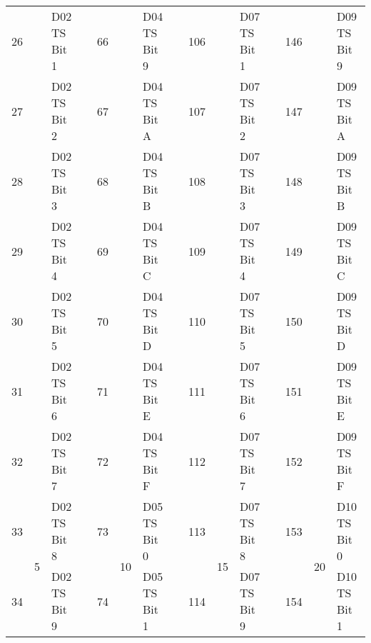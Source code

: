 \documentclass[]{article}
\begin{document}
\begin{landscape}
\begin{table}[]
\begin{tabular}{lllllllllllllll}
			26           &                    & D02 TS Bit 1                  &                   & 66           &                     & D04 TS Bit 9      &  & 106          &                     & D07 TS Bit 1      &  & 146          &                     & D09 TS Bit 9      \\
			27           &                    & D02 TS Bit 2                  &                   & 67           &                     & D04 TS Bit A      &  & 107          &                     & D07 TS Bit 2      &  & 147          &                     & D09 TS Bit A      \\
			28           &                    & D02 TS Bit 3                  &                   & 68           &                     & D04 TS Bit B      &  & 108          &                     & D07 TS Bit 3      &  & 148          &                     & D09 TS Bit B      \\
			29           &                    & D02 TS Bit 4                  &                   & 69           &                     & D04 TS Bit C      &  & 109          &                     & D07 TS Bit 4      &  & 149          &                     & D09 TS Bit C      \\
			30           &                    & D02 TS Bit 5                  &                   & 70           &                     & D04 TS Bit D      &  & 110          &                     & D07 TS Bit 5      &  & 150          &                     & D09 TS Bit D      \\
			31           &                    & D02 TS Bit 6                  &                   & 71           &                     & D04 TS Bit E      &  & 111          &                     & D07 TS Bit 6      &  & 151          &                     & D09 TS Bit E      \\
			32           &                    & D02 TS Bit 7                  &                   & 72           &                     & D04 TS Bit F      &  & 112          &                     & D07 TS Bit 7      &  & 152          &                     & D09 TS Bit F      \\ \cline{1-3} \cline{5-7} \cline{9-11} \cline{13-15} 
			33           & \multirow{8}{*}{5} & D02 TS Bit 8                  &                   & 73           & \multirow{8}{*}{10} & D05 TS Bit 0      &  & 113          & \multirow{8}{*}{15} & D07 TS Bit 8      &  & 153          & \multirow{8}{*}{20} & D10 TS Bit 0      \\
			34           &                    & D02 TS Bit 9                  &                   & 74           &                     & D05 TS Bit 1      &  & 114          &                     & D07 TS Bit 9      &  & 154          &                     & D10 TS Bit 1      \\

\end{tabular}
\end{table}
\end{landscape}
\end{document}
